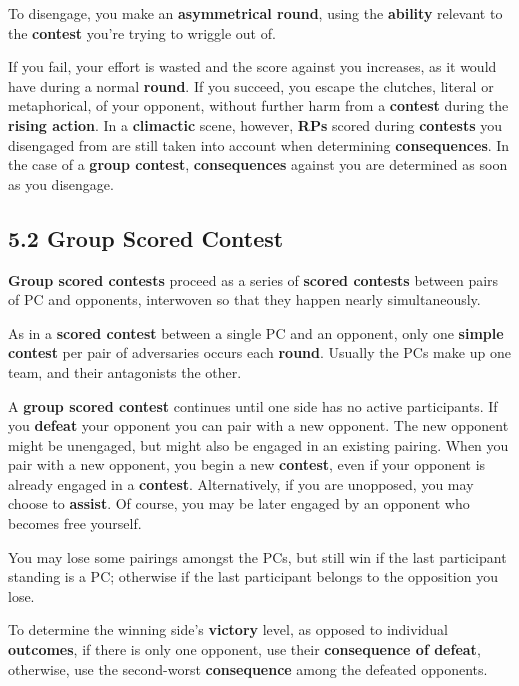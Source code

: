 \documentclass[
]{article}
\begin{document}
To disengage, you make an \textbf{asymmetrical round}, using the
\textbf{ability} relevant to the \textbf{contest} you're trying to
wriggle out of.

If you fail, your effort is wasted and the score against you increases,
as it would have during a normal \textbf{round}. If you succeed, you
escape the clutches, literal or metaphorical, of your opponent, without
further harm from a \textbf{contest} during the \textbf{rising action}.
In a \textbf{climactic} scene, however, \textbf{RPs} scored during
\textbf{contests} you disengaged from are still taken into account when
determining \textbf{consequences}. In the case of a \textbf{group
contest}, \textbf{consequences} against you are determined as soon as
you disengage.

\hypertarget{group-scored-contest}{%
\subsection{5.2 Group Scored Contest}\label{group-scored-contest}}

\textbf{Group scored contests} proceed as a series of \textbf{scored
contests} between pairs of PC and opponents, interwoven so that they
happen nearly simultaneously.

As in a \textbf{scored contest} between a single PC and an opponent,
only one \textbf{simple contest} per pair of adversaries occurs each
\textbf{round}. Usually the PCs make up one team, and their antagonists
the other.

A \textbf{group scored contest} continues until one side has no active
participants. If you \textbf{defeat} your opponent you can pair with a
new opponent. The new opponent might be unengaged, but might also be
engaged in an existing pairing. When you pair with a new opponent, you
begin a new \textbf{contest}, even if your opponent is already engaged
in a \textbf{contest}. Alternatively, if you are unopposed, you may
choose to \textbf{assist}. Of course, you may be later engaged by an
opponent who becomes free yourself.

You may lose some pairings amongst the PCs, but still win if the last
participant standing is a PC; otherwise if the last participant belongs
to the opposition you lose.

To determine the winning side's \textbf{victory} level, as opposed to
individual \textbf{outcomes}, if there is only one opponent, use their
\textbf{consequence of defeat}, otherwise, use the second-worst
\textbf{consequence} among the defeated opponents.
\end{document}
